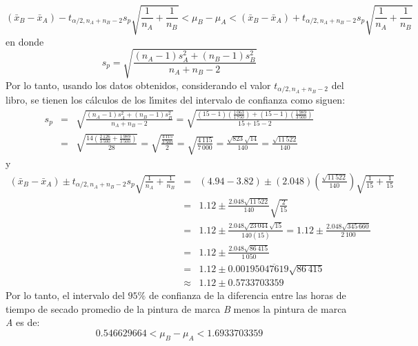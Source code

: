 \begin{solucion}
 \begin{equation*}
  \left( \bar{x}_B - \bar{x}_A \right) - t_{\alpha/2,n_A+n_B-2}s_p\sqrt{\frac{1}{n_A} + \frac{1}{n_B}} < \mu_B - \mu_A < \left( \bar{x}_B - \bar{x}_A \right) + t_{\alpha/2,n_A+n_B-2}s_p\sqrt{\frac{1}{n_A} + \frac{1}{n_B}}
 \end{equation*}
 en donde
 \begin{equation*}
  s_p = \sqrt{\frac{\left( n_A -1 \right)s_A^2 + \left( n_B - 1 \right)s_B^2}{n_A + n_B - 2}}
 \end{equation*}
 Por lo tanto, usando los datos obtenidos, considerando el valor $t_{\alpha/2, n_A+n_B-2}$ del libro, se tienen los c\'alculos de los l\'{\i}mites del intervalo de confianza como siguen:
 \begin{eqnarray*}
  s_p & = & \sqrt{\frac{\left( n_A -1 \right)s_A^2 + \left( n_B - 1 \right)s_B^2}{n_A + n_B - 2}} = \sqrt{\frac{ \displaystyle{ (15-1)\left( \frac{1\,063}{1\,750} \right) + (15-1)\left( \frac{1\,989}{3\,500} \right)}}{15+15-2}} \\
  & = & \sqrt{\frac{ \displaystyle{ 14\left( \frac{2\,126}{3\,500} + \frac{1\,989}{3\,500} \right)}}{28}} = \sqrt{\frac{\displaystyle{\frac{4\,115}{3\,500}}}{2}} = \sqrt{\frac{4\,115}{7\,000}} = \frac{\sqrt{823}\sqrt{14}}{140} = \frac{\sqrt{11\,522}}{140}
 \end{eqnarray*}
 y
 \begin{eqnarray*}
  \left( \bar{x}_B - \bar{x}_A \right) \pm t_{\alpha/2,n_A+n_B-2}s_p\sqrt{\frac{1}{n_A} + \frac{1}{n_B}} & = & (4.94 - 3.82) \pm (2.048) \left( \frac{\sqrt{11\,522}}{140} \right) \sqrt{\frac{1}{15} +\frac{1}{15}} \\
  & = & 1.12 \pm \frac{2.048\sqrt{11\,522}}{140} \sqrt{\frac{2}{15}} \\
  & = & 1.12 \pm \frac{2.048\sqrt{23\,044}\sqrt{15}}{140(15)} = 1.12 \pm \frac{2.048\sqrt{345\,660}}{2\,100} \\
  & = & 1.12 \pm \frac{2.048\sqrt{86\,415}}{1\,050} \\
  & = & 1.12 \pm 0.00195\overline{047619}\sqrt{86\,415} \\
  & \approx & 1.12 \pm 0.5733703359
 \end{eqnarray*}
 Por lo tanto, el intervalo del $95\%$ de confianza de la diferencia entre las horas de tiempo de secado promedio de la pintura de marca \textit{B} menos la pintura de marca \textit{A} es de:
 \begin{equation*}
  0.546629664 < \mu_B - \mu_A < 1.6933703359
 \end{equation*}

\end{solucion}
